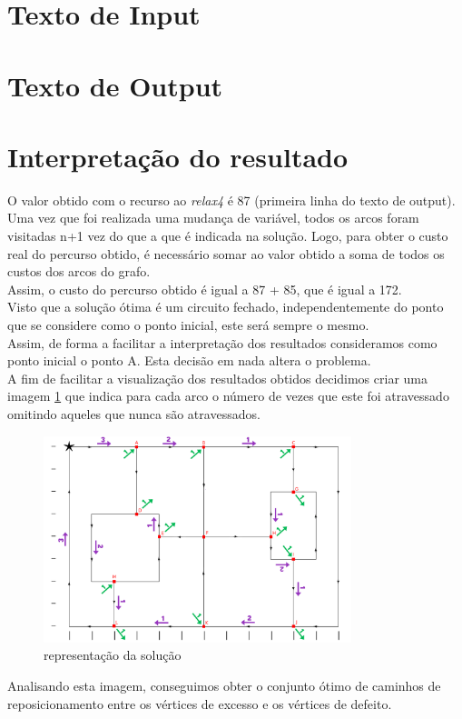 \documentclass[a4paper]{report}
\begin{document}
\pagebreak
\section{Texto de Input}
\label{input}


\pagebreak
\section{Texto de Output}
\label{output}


\pagebreak
\section{Interpretação do resultado}
\label{solution}
O valor obtido com o recurso ao \textit{relax4} é 87 (primeira linha do texto de
output). Uma vez que foi realizada uma mudança de variável, todos os arcos foram
visitadas n+1 vez do que a que é indicada na solução. Logo, para obter o custo
real do percurso obtido, é necessário somar ao valor obtido a soma de todos os
custos dos arcos do grafo.\\
Assim, o custo do percurso obtido é igual a 87 + 85, que é igual a 172.\\
Visto que a solução ótima é um circuito fechado, independentemente do ponto
que se considere como o ponto inicial, este será sempre o mesmo. \\
Assim, de forma a facilitar a interpretação dos resultados consideramos como
ponto inicial o ponto A. Esta decisão em nada altera o problema.\\
A fim de facilitar a visualização dos resultados obtidos decidimos criar uma
imagem \ref{fig:visited} que indica para cada arco o número de vezes que este
foi atravessado omitindo aqueles que nunca são atravessados.

\begin{figure}[H]
    \begin{center}
        \includegraphics[width=0.8\textwidth]{images/desafioVisited.png}\par
        \caption{representação da solução}
        \label{fig:visited}
    \end{center}
\end{figure}
Analisando esta imagem, conseguimos obter o conjunto ótimo de caminhos de
reposicionamento entre os vértices de excesso e os vértices de defeito.
\end{document}
